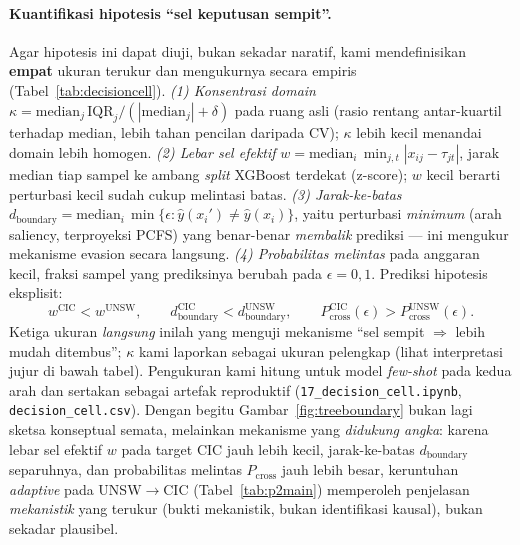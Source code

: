 \documentclass[11pt,a4paper]{article}
\begin{document}
\paragraph{Kuantifikasi hipotesis ``sel keputusan sempit''.} Agar hipotesis ini
dapat diuji, bukan sekadar naratif, kami mendefinisikan \textbf{empat} ukuran
terukur dan mengukurnya secara empiris (Tabel~\ref{tab:decisioncell}).
\emph{(1) Konsentrasi domain} $\kappa = \mathrm{median}_j\,\mathrm{IQR}_j /
(|\mathrm{median}_j| + \delta)$ pada ruang asli (rasio rentang antar-kuartil
terhadap median, lebih tahan pencilan daripada CV); $\kappa$ lebih kecil menandai
domain lebih homogen. \emph{(2) Lebar sel efektif}
$w = \mathrm{median}_i\, \min_{j,t} |x_{ij} - \tau_{jt}|$, jarak median tiap sampel
ke ambang \emph{split} XGBoost terdekat (z-score); $w$ kecil berarti perturbasi
kecil sudah cukup melintasi batas. \emph{(3) Jarak-ke-batas}
$d_{\text{boundary}} = \mathrm{median}_i\, \min\{\epsilon : \hat{y}(x_i')\neq
\hat{y}(x_i)\}$, yaitu perturbasi \emph{minimum} (arah saliency, terproyeksi PCFS)
yang benar-benar \emph{membalik} prediksi --- ini mengukur mekanisme evasion secara
langsung. \emph{(4) Probabilitas melintas} pada anggaran kecil, fraksi sampel yang
prediksinya berubah pada $\epsilon{=}0{,}1$. Prediksi hipotesis eksplisit:
\begin{equation}
w^{\text{CIC}} < w^{\text{UNSW}}, \qquad
d_{\text{boundary}}^{\text{CIC}} < d_{\text{boundary}}^{\text{UNSW}}, \qquad
P_{\text{cross}}^{\text{CIC}}(\epsilon) > P_{\text{cross}}^{\text{UNSW}}(\epsilon).
\end{equation}
Ketiga ukuran \emph{langsung} inilah yang menguji mekanisme ``sel sempit $\Rightarrow$
lebih mudah ditembus''; $\kappa$ kami laporkan sebagai ukuran pelengkap (lihat
interpretasi jujur di bawah tabel).
Pengukuran kami hitung untuk model \emph{few-shot} pada kedua arah dan sertakan
sebagai artefak reproduktif (\texttt{17\_decision\_cell.ipynb},
\texttt{decision\_cell.csv}). Dengan begitu Gambar~\ref{fig:treeboundary} bukan lagi
sketsa konseptual semata, melainkan mekanisme yang \emph{didukung angka}: karena
lebar sel efektif $w$ pada target CIC jauh lebih kecil, jarak-ke-batas
$d_{\text{boundary}}$ separuhnya, dan probabilitas melintas $P_{\text{cross}}$ jauh
lebih besar, keruntuhan \emph{adaptive} pada
UNSW$\rightarrow$CIC (Tabel~\ref{tab:p2main}) memperoleh penjelasan \emph{mekanistik} yang
terukur (bukti mekanistik, bukan identifikasi kausal), bukan sekadar plausibel.
\end{document}
